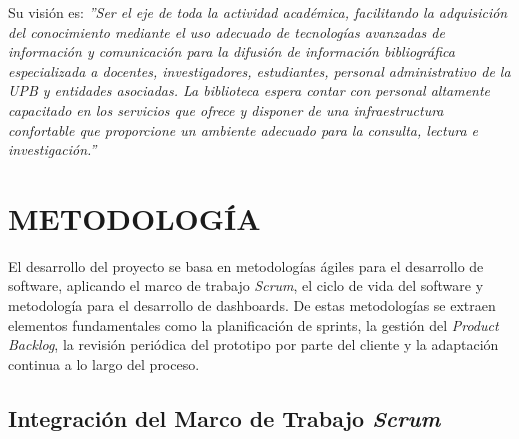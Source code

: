 \documentclass[spanish]{ieee_upb}
\begin{document}
Su visión es:
\textit{''Ser el eje de toda la actividad académica, facilitando la adquisición del conocimiento mediante el uso adecuado de tecnologías avanzadas de información y comunicación para la difusión de información bibliográfica especializada a docentes, investigadores, estudiantes, personal administrativo de la UPB y entidades asociadas. La biblioteca espera contar con personal altamente capacitado en los servicios que ofrece y disponer de una infraestructura confortable que proporcione un ambiente adecuado para la consulta, lectura e investigación.''} \cite{UPB_Biblioteca}








\newpage
\section{METODOLOGÍA}
\vspace{0.3cm}
El desarrollo del proyecto se basa en metodologías ágiles para el desarrollo de software, aplicando el marco de trabajo \textit{Scrum}, el ciclo de vida del software y metodología para el desarrollo de dashboards. De estas metodologías se extraen elementos fundamentales como la planificación de sprints, la gestión del \textit{Product Backlog}, la revisión periódica del prototipo por parte del cliente y la adaptación continua a lo largo del proceso.


\subsection{Integración del Marco de Trabajo \textit{Scrum}}
\end{document}

